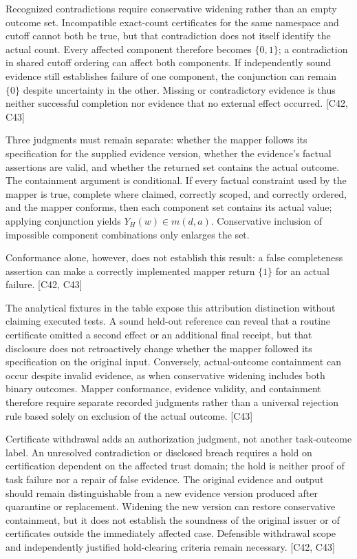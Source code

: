 \documentclass[11pt]{article}
\begin{document}
Recognized contradictions require conservative widening rather than an empty outcome set. Incompatible exact-count certificates for the same namespace and cutoff cannot both be true, but that contradiction does not itself identify the actual count. Every affected component therefore becomes $\{0,1\}$; a contradiction in shared cutoff ordering can affect both components. If independently sound evidence still establishes failure of one component, the conjunction can remain $\{0\}$ despite uncertainty in the other. Missing or contradictory evidence is thus neither successful completion nor evidence that no external effect occurred. [C42, C43]

Three judgments must remain separate: whether the mapper follows its specification for the supplied evidence version, whether the evidence's factual assertions are valid, and whether the returned set contains the actual outcome. The containment argument is conditional. If every factual constraint used by the mapper is true, complete where claimed, correctly scoped, and correctly ordered, and the mapper conforms, then each component set contains its actual value; applying conjunction yields $Y_H(w)\in m(d,a)$. Conservative inclusion of impossible component combinations only enlarges the set.

Conformance alone, however, does not establish this result: a false completeness assertion can make a correctly implemented mapper return $\{1\}$ for an actual failure. [C42, C43]

The analytical fixtures in the table expose this attribution distinction without claiming executed tests. A sound held-out reference can reveal that a routine certificate omitted a second effect or an additional final receipt, but that disclosure does not retroactively change whether the mapper followed its specification on the original input. Conversely, actual-outcome containment can occur despite invalid evidence, as when conservative widening includes both binary outcomes. Mapper conformance, evidence validity, and containment therefore require separate recorded judgments rather than a universal rejection rule based solely on exclusion of the actual outcome. [C43]

Certificate withdrawal adds an authorization judgment, not another task-outcome label. An unresolved contradiction or disclosed breach requires a hold on certification dependent on the affected trust domain; the hold is neither proof of task failure nor a repair of false evidence. The original evidence and output should remain distinguishable from a new evidence version produced after quarantine or replacement. Widening the new version can restore conservative containment, but it does not establish the soundness of the original issuer or of certificates outside the immediately affected case. Defensible withdrawal scope and independently justified hold-clearing criteria remain necessary. [C42, C43]
\end{document}
